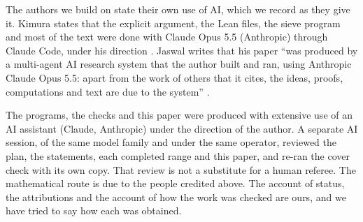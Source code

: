 \documentclass[11pt]{article}
\theoremstyle{definition}
\begin{document}
The authors we build on state their own use of AI, which we record as they give it. Kimura states that the explicit
argument, the Lean files, the sieve program and most of the text were done with Claude Opus 5.5 (Anthropic) through
Claude Code, under his direction \cite[\S8]{Kimura2026}. Jaswal writes that his paper ``was produced by a multi-agent AI
research system that the author built and ran, using Anthropic Claude Opus 5.5: apart from the work of others that it
cites, the ideas, proofs, computations and text are due to the system'' \cite{Jaswal2026}.

The programs, the checks and this paper were produced with extensive use of an AI assistant (Claude, Anthropic) under the
direction of the author. A separate AI session, of the same model family and under the same operator, reviewed the plan,
the statements, each completed range and this paper, and re-ran the cover check with its own copy. That
review is not a substitute for a human referee. The mathematical route is due to the people credited above.
The account of status, the attributions and the account of how the work was checked are ours, and we have tried to say
how each was obtained.



\end{document}
